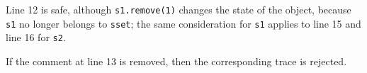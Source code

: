 Line 12 is safe, although \lstinline{s1.remove(1)} changes the state of the object, because \lstinline{s1} no longer belongs to
\lstinline{sset}; the same consideration for \lstinline{s1} applies to line 15 and line 16 for \lstinline{s2}. 

If the comment at line 13 is removed, then the corresponding trace is rejected.
